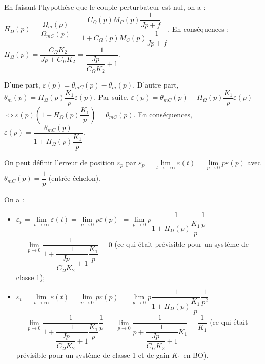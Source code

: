 \begin{multicols}{2}
\else
\fi


\ifprof
\begin{corrige}
En faisant l'hypothèse que le couple perturbateur est nul, on a :
$H_{\Omega}(p)=\dfrac{\Omega_m(p)}{\Omega_{mC}(p)}=\dfrac{C_{\Omega}(p)M_C(p)\dfrac{1}{Jp+f}}{1+C_{\Omega}(p)M_C(p)\dfrac{1}{Jp+f}}$. En conséquences : 
$H_{\Omega}(p)=\dfrac{C_{\Omega} K_2}{Jp+C_{\Omega} K_2 } = \dfrac{1}{\dfrac{Jp}{C_{\Omega} K_2}+1 } $.

\end{corrige}
\else
\fi

\ifprof

\begin{corrige}
D'une part, $\varepsilon(p)=\theta_{mC}(p)-\theta_{m}(p)$. D'autre part, 
$\theta_{m}(p) =H_{\Omega}(p) \dfrac{K_1}{p} \varepsilon(p)$. Par suite, 
$\varepsilon(p)=\theta_{mC}(p)-H_{\Omega}(p) \dfrac{K_1}{p}\varepsilon(p) $ 
$\Leftrightarrow \varepsilon(p)\left( 1+H_{\Omega}(p) \dfrac{K_1}{p}\right)= \theta_{mC}(p)$. 
En conséquences, $\varepsilon(p)=\dfrac{ \theta_{mC}(p)}{ 1+H_{\Omega}(p) \dfrac{K_1}{p}}$.
\end{corrige}
\else
\fi

\ifprof
\else
\begin{methode} On peut définir l'erreur de position $\varepsilon_p$ par $\varepsilon_p=\lim\limits_{t \to +\infty} \varepsilon(t)=\lim\limits_{p \to 0} p\varepsilon(p)$ avec  $\theta_{mC}(p)=\dfrac{1}{p}$ (entrée échelon).
\end{methode}
\fi


\ifprof
\begin{corrige}
On a :
\begin{itemize}
\item $\varepsilon_p = \lim\limits_{t\to \infty} \varepsilon(t)= \lim\limits_{p\to 0} p\varepsilon(p) $ $= \lim\limits_{p\to 0} p \dfrac{ 1}{ 1+H_{\Omega}(p) \dfrac{K_1}{p}} \dfrac {1}{p}$
$= \lim\limits_{p\to 0} \dfrac{ 1}{ 1+\dfrac{1}{\dfrac{Jp}{C_{\Omega} K_2}+1 } \dfrac{K_1}{p}} = 0$ (ce qui était prévisible pour un système de classe 1);
\item $\varepsilon_v = \lim\limits_{t\to \infty} \varepsilon(t)= \lim\limits_{p\to 0} p\varepsilon(p) $ $= \lim\limits_{p\to 0} p \dfrac{ 1}{ 1+H_{\Omega}(p) \dfrac{K_1}{p}} \dfrac {1}{p^2}$
$= \lim\limits_{p\to 0} \dfrac{ 1}{ 1+\dfrac{1}{\dfrac{Jp}{C_{\Omega} K_2}+1 } \dfrac{K_1}{p}}\dfrac {1}{p} $
$= \lim\limits_{p\to 0} \dfrac{ 1}{ p+\dfrac{1}{\dfrac{Jp}{C_{\Omega} K_2}+1 } K_1}= \dfrac{1}{K_1}$ (ce qui était prévisible pour un système de classe 1 et de gain $K_1$ en BO).
\end{itemize}


\end{corrige}
\end{multicols}
